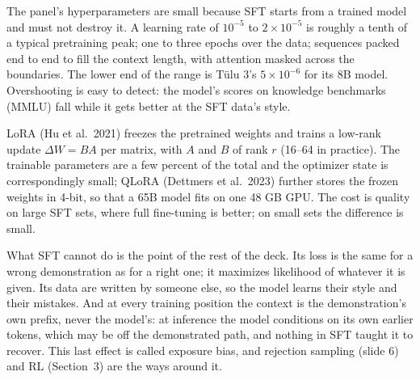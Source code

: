\documentclass[11pt,letterpaper]{article}
\begin{document}
The panel's hyperparameters are small because SFT starts from a trained model and must not destroy it. A learning rate of $10^{-5}$ to $2\times10^{-5}$ is roughly a tenth of a typical pretraining peak; one to three epochs over the data; sequences packed end to end to fill the context length, with attention masked across the boundaries. The lower end of the range is Tülu 3's $5\times10^{-6}$ for its 8B model. Overshooting is easy to detect: the model's scores on knowledge benchmarks (MMLU) fall while it gets better at the SFT data's style.

LoRA (Hu et al.\ 2021) freezes the pretrained weights and trains a low-rank update $\Delta W=BA$ per matrix, with $A$ and $B$ of rank $r$ (16--64 in practice). The trainable parameters are a few percent of the total and the optimizer state is correspondingly small; QLoRA (Dettmers et al.\ 2023) further stores the frozen weights in 4-bit, so that a 65B model fits on one 48 GB GPU. The cost is quality on large SFT sets, where full fine-tuning is better; on small sets the difference is small.

What SFT cannot do is the point of the rest of the deck. Its loss is the same for a wrong demonstration as for a right one; it maximizes likelihood of whatever it is given. Its data are written by someone else, so the model learns their style and their mistakes. And at every training position the context is the demonstration's own prefix, never the model's: at inference the model conditions on its own earlier tokens, which may be off the demonstrated path, and nothing in SFT taught it to recover. This last effect is called exposure bias, and rejection sampling (slide 6) and RL (Section~3) are the ways around it.
\end{document}
